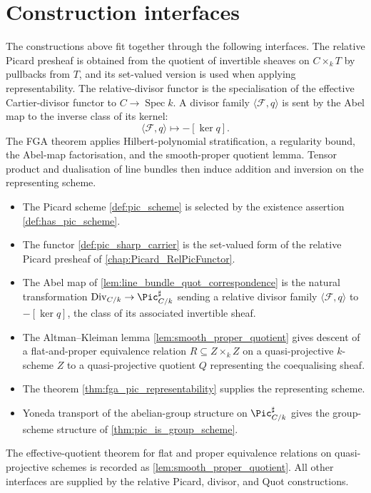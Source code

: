 \section{Construction interfaces}
\label{sec:fga_pic_lean_encoding}

The constructions above fit together through the following interfaces. The
relative Picard presheaf is obtained from the quotient of invertible sheaves
on \(C\times_kT\) by pullbacks from \(T\), and its set-valued version is used
when applying representability. The relative-divisor functor is the
specialisation of the effective Cartier-divisor functor to
\(C\to\operatorname{Spec}k\). A divisor family \(\langle\mathcal F,q\rangle\)
is sent by the Abel map to the inverse class of its kernel:
\[
  \langle\mathcal F,q\rangle\longmapsto-[\ker q].
\]
The FGA theorem applies Hilbert-polynomial stratification, a regularity bound,
the Abel-map factorisation, and the smooth-proper quotient lemma. Tensor
product and dualisation of line bundles then induce addition and inversion on
the representing scheme.

\begin{itemize}
  \item The Picard scheme \cref{def:pic_scheme} is selected by the
    existence assertion \cref{def:has_pic_scheme}.
  \item The functor \cref{def:pic_sharp_carrier} is the set-valued form of
    the relative Picard presheaf of \cref{chap:Picard_RelPicFunctor}.
  \item The Abel map of \cref{lem:line_bundle_quot_correspondence} is the natural
    transformation \(\mathrm{Div}_{C/k} \to \Pic^\sharp_{C/k}\) sending a
    relative divisor family \(\langle \mathcal F, q\rangle\) to
    \(-[\ker q]\), the class of its associated invertible sheaf.
  \item The Altman--Kleiman lemma \cref{lem:smooth_proper_quotient} gives
    descent of a flat-and-proper equivalence relation \(R \subseteq Z
    \times_k Z\) on a quasi-projective \(k\)-scheme \(Z\) to a
    quasi-projective quotient \(Q\) representing the coequalising sheaf.
  \item The theorem \cref{thm:fga_pic_representability} supplies the
    representing scheme.
  \item Yoneda transport of the abelian-group structure on
    \(\Pic^\sharp_{C/k}\) gives the group-scheme structure of
    \cref{thm:pic_is_group_scheme}.
\end{itemize}

The effective-quotient theorem for flat and proper equivalence relations on
quasi-projective schemes is recorded as
\cref{lem:smooth_proper_quotient}. All other interfaces are supplied by the
relative Picard, divisor, and Quot constructions.

